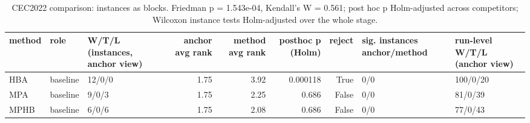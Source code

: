 \begin{table}[t]
\centering
\scriptsize
\caption{CEC2022 comparison: instances as blocks. Friedman p = 1.543e-04, Kendall's W = 0.561; post hoc p Holm-adjusted across competitors; Wilcoxon instance tests Holm-adjusted over the whole stage.}
\label{tab:cec2022_comparison_global}
\begin{tabular}{lllrrrrll}
\toprule
method & role & W/T/L (instances, anchor view) & anchor avg rank & method avg rank & posthoc p (Holm) & reject & sig. instances anchor/method & run-level W/T/L (anchor view) \\
\midrule
HBA & baseline & 12/0/0 & 1.75 & 3.92 & 0.000118 & True & 0/0 & 100/0/20 \\
MPA & baseline & 9/0/3 & 1.75 & 2.25 & 0.686 & False & 0/0 & 81/0/39 \\
MPHB & baseline & 6/0/6 & 1.75 & 2.08 & 0.686 & False & 0/0 & 77/0/43 \\
\bottomrule
\end{tabular}
\end{table}
